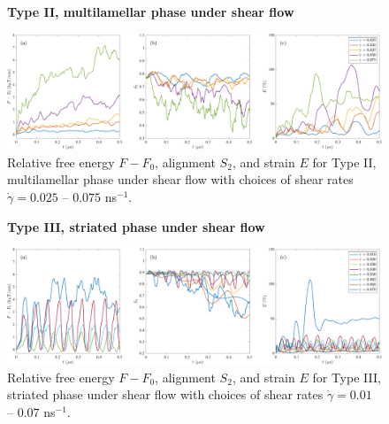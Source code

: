 \begin{figure}[h!]
\textbf{Type II, multilamellar phase under shear flow}\par\medskip
\begin{center}
\includegraphics[width=\textwidth]{SMFigures/MLShRaw.pdf}
\end{center}
\caption{
Relative free energy $F - F_0$,
alignment $S_2$, and strain $E$ for
Type II, multilamellar phase under shear flow with choices of shear rates $\dot\gamma=0.025$ -- $0.075$ ns$^{-1}$.
}
\label{fig:mlshraw}
\end{figure}


\begin{figure}[h!]
\textbf{Type III, striated phase under shear flow}\par\medskip
\begin{center}
\includegraphics[width=\textwidth]{SMFigures/StShRaw.pdf}
\end{center}
\caption{
Relative free energy $F - F_0$,
alignment $S_2$, and strain $E$ for
Type III, striated phase under shear flow with choices of shear rates $\dot\gamma=0.01$ -- $0.07$ ns$^{-1}$.
}
\label{fig:stshraw}
\end{figure}

